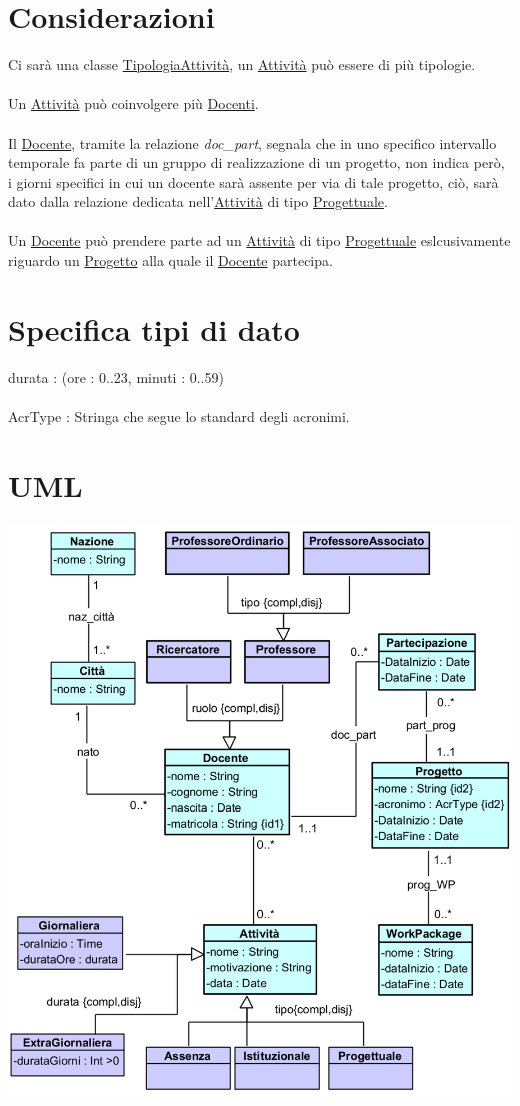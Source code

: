 \documentclass[12pt, letterpaper]{article}
\newcommand{\acc}{\\\hphantom{}\\}
\begin{document}
\section{Considerazioni}
Ci sarà una classe \underline{TipologiaAttività}, un \underline{Attività} può essere di
più tipologie.\acc Un \underline{Attività} può coinvolgere più \underline{Docenti}.\acc
Il \underline{Docente}, tramite la relazione \textit{doc\_part}, segnala che in uno specifico
intervallo temporale fa parte di un gruppo di realizzazione di un progetto, non indica però, i giorni
specifici in cui un docente sarà assente per via di tale progetto, ciò, sarà dato dalla
relazione dedicata nell'\underline{Attività} di tipo \underline{Progettuale}.\acc
Un \underline{Docente} può prendere parte ad un \underline{Attività} di tipo \underline{Progettuale}
eslcusivamente riguardo un  \underline{Progetto} alla quale il \underline{Docente} partecipa.
\newpage
\section{Specifica tipi di dato}
durata : (ore : 0..23, minuti : 0..59)\acc
AcrType : Stringa che segue lo standard degli acronimi.
\newpage
\section{UML}\begin{center}
    \includegraphics[width=1.1\textwidth]{images/UML.png}
\end{center}
\end{document}
